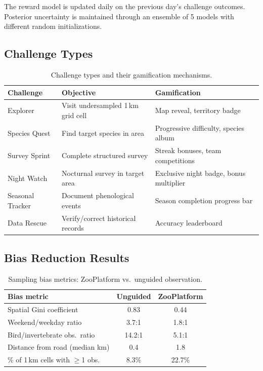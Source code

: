 \documentclass[11pt,a4paper]{article}
\begin{document}
The reward model is updated daily on the previous day's challenge
outcomes. Posterior uncertainty is maintained through an ensemble of
5 models with different random initializations.

\subsection{Challenge Types}

\begin{table}[H]
\centering
\caption{Challenge types and their gamification mechanisms.}
\label{tab:challenges}
\begin{tabular}{p{2.5cm}p{4cm}p{4.5cm}}
\toprule
\textbf{Challenge} & \textbf{Objective} & \textbf{Gamification} \\
\midrule
Explorer & Visit undersampled 1\,km grid cell & Map reveal, territory
  badge \\
Species Quest & Find target species in area & Progressive difficulty,
  species album \\
Survey Sprint & Complete structured survey & Streak bonuses, team
  competitions \\
Night Watch & Nocturnal survey in target area & Exclusive night badge,
  bonus multiplier \\
Seasonal Tracker & Document phenological events & Season completion
  progress bar \\
Data Rescue & Verify/correct historical records & Accuracy leaderboard \\
\bottomrule
\end{tabular}
\end{table}

\subsection{Bias Reduction Results}

\begin{table}[H]
\centering
\caption{Sampling bias metrics: ZooPlatform vs.\ unguided observation.}
\label{tab:bias}
\begin{tabular}{lcc}
\toprule
\textbf{Bias metric} & \textbf{Unguided} & \textbf{ZooPlatform} \\
\midrule
Spatial Gini coefficient & 0.83 & 0.44 \\
Weekend/weekday ratio & 3.7:1 & 1.8:1 \\
Bird/invertebrate obs.\ ratio & 14.2:1 & 5.1:1 \\
Distance from road (median km) & 0.4 & 1.8 \\
\% of 1\,km cells with $\geq$1 obs. & 8.3\% & 22.7\% \\
\bottomrule
\end{tabular}
\end{table}
\end{document}
